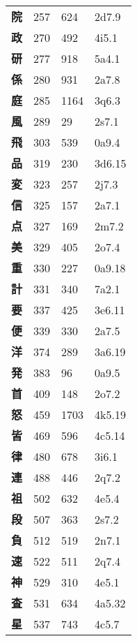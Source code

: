 \begin{longtable}[c]{llll}
    \bfseries 院 & 257 & 624 & 2d7.9\\
    \bfseries 政 & 270 & 492 & 4i5.1\\
    \bfseries 研 & 277 & 918 & 5a4.1\\
    \bfseries 係 & 280 & 931 & 2a7.8\\
    \bfseries 庭 & 285 & 1164 & 3q6.3\\
    \bfseries 風 & 289 & 29 & 2s7.1\\
    \bfseries 飛 & 303 & 539 & 0a9.4\\
    \bfseries 品 & 319 & 230 & 3d6.15\\
    \bfseries 変 & 323 & 257 & 2j7.3\\
    \bfseries 信 & 325 & 157 & 2a7.1\\
    \bfseries 点 & 327 & 169 & 2m7.2\\
    \bfseries 美 & 329 & 405 & 2o7.4\\
    \bfseries 重 & 330 & 227 & 0a9.18\\
    \bfseries 計 & 331 & 340 & 7a2.1\\
    \bfseries 要 & 337 & 425 & 3e6.11\\
    \bfseries 便 & 339 & 330 & 2a7.5\\
    \bfseries 洋 & 374 & 289 & 3a6.19\\
    \bfseries 発 & 383 & 96 & 0a9.5\\
    \bfseries 首 & 409 & 148 & 2o7.2\\
    \bfseries 怒 & 459 & 1703 & 4k5.19\\
    \bfseries 皆 & 469 & 596 & 4c5.14\\
    \bfseries 律 & 480 & 678 & 3i6.1\\
    \bfseries 連 & 488 & 446 & 2q7.2\\
    \bfseries 祖 & 502 & 632 & 4e5.4\\
    \bfseries 段 & 507 & 363 & 2s7.2\\
    \bfseries 負 & 512 & 519 & 2n7.1\\
    \bfseries 速 & 522 & 511 & 2q7.4\\
    \bfseries 神 & 529 & 310 & 4e5.1\\
    \bfseries 査 & 531 & 634 & 4a5.32\\
    \bfseries 星 & 537 & 743 & 4c5.7\\
  \end{longtable}
